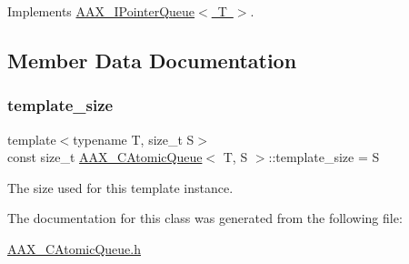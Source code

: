 Implements \mbox{\hyperlink{a01861_a005cd2626fb8db4d5d708f255b48a0be}{A\+A\+X\+\_\+\+I\+Pointer\+Queue$<$ T $>$}}.



\subsection{Member Data Documentation}
\mbox{\label{a01441_a7040410a6baeae48d153ef44ee0df1f1}} 
\subsubsection{\texorpdfstring{template\_size}{template\_size}}
{\footnotesize\ttfamily template$<$typename T, size\+\_\+t S$>$ \\
const size\+\_\+t \mbox{\hyperlink{a01441}{A\+A\+X\+\_\+\+C\+Atomic\+Queue}}$<$ T, S $>$\+::template\+\_\+size = S\hspace{0.3cm}{\ttfamily [static]}}



The size used for this template instance. 



The documentation for this class was generated from the following file\+:\begin{DoxyCompactItemize}
\item 
\mbox{\hyperlink{a00404}{A\+A\+X\+\_\+\+C\+Atomic\+Queue.\+h}}\end{DoxyCompactItemize}
